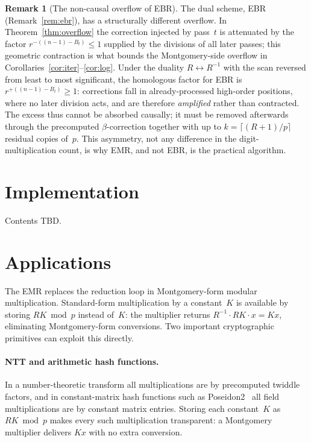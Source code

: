 \documentclass[reqno]{amsart}
\theoremstyle{definition}
\newtheorem{remark}[theorem]{Remark}
\begin{document}
\begin{remark}[The non-causal overflow of EBR]
The dual scheme, EBR (Remark~\ref{rem:ebr}), has a structurally different overflow.
In Theorem~\ref{thm:overflow} the correction injected by pass~$t$ is attenuated by the factor $r^{-((n-1)-B_t)}\le1$ supplied by the divisions of all later passes; this geometric contraction is what bounds the Montgomery-side overflow in Corollaries~\ref{cor:iter}--\ref{cor:log}.
Under the duality $R\leftrightarrow R^{-1}$ with the scan reversed from least to most significant, the homologous factor for EBR is $r^{+((n-1)-B_t)}\ge1$: corrections fall in already-processed high-order positions, where no later division acts, and are therefore \emph{amplified} rather than contracted.
The excess thus cannot be absorbed causally; it must be removed afterwards through the precomputed $\beta$-correction together with up to $k=\lceil(R+1)/p\rceil$ residual copies of~$p$.
This asymmetry, not any difference in the digit-multiplication count, is why EMR, and not EBR, is the practical algorithm.
\end{remark}

\section{Implementation}\label{sec:impl}

Contents TBD.

\section{Applications}\label{sec:apps}

The EMR replaces the reduction loop in Montgomery-form modular multiplication.
Standard-form multiplication by a constant~$K$ is available by storing $RK\bmod p$ instead of~$K$: the multiplier returns $R^{-1}\cdot RK\cdot x = Kx$, eliminating Montgomery-form conversions.
Two important cryptographic primitives can exploit this directly.

\paragraph{NTT and arithmetic hash functions.}
In a number-theoretic transform all multiplications are by precomputed twiddle factors, and in constant-matrix hash functions such as Poseidon2~\cite{poseidon2} all field multiplications are by constant matrix entries.
Storing each constant~$K$ as $RK\bmod p$ makes every such multiplication transparent: a Montgomery multiplier delivers $Kx$ with no extra conversion.
\end{document}
